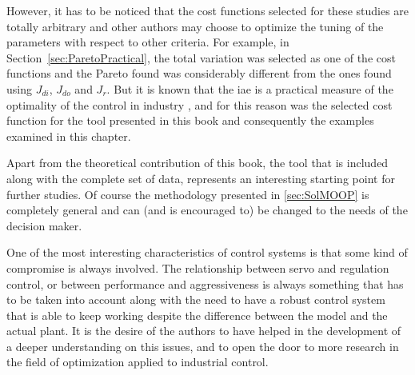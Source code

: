 However, it has to be noticed that the cost functions selected for these studies are totally arbitrary and other authors may choose to optimize the tuning of the parameters with respect to other criteria. For example, in Section~\ref{sec:ParetoPractical}, the total variation was selected as one of the cost functions and the Pareto found was considerably different from the ones found using $J_{di}$, $J_{do}$ and $J_r$. But it is known that the \gls{iae} is a practical measure of the optimality of the control in industry \citep{Shinskey2002}, and for this reason was the selected cost function for the tool presented in this book and consequently the examples examined in this chapter.

Apart from the theoretical contribution of this book, the \matlab{} tool that is included along with the complete set of data, represents an interesting starting point for further studies. Of course the methodology presented in \ref{sec:SolMOOP} is completely general and can (and is encouraged to) be changed to the needs of the decision maker.

One of the most interesting characteristics of control systems is that some kind of compromise is always involved. The relationship between servo and regulation control, or between performance and aggressiveness is always something that has to be taken into account along with the need to have a robust control system that is able to keep working despite the difference between the model and the actual plant. It is the desire of the authors to have helped in the development of a deeper understanding on this issues, and to open the door to more research in the field of optimization applied to industrial control.



